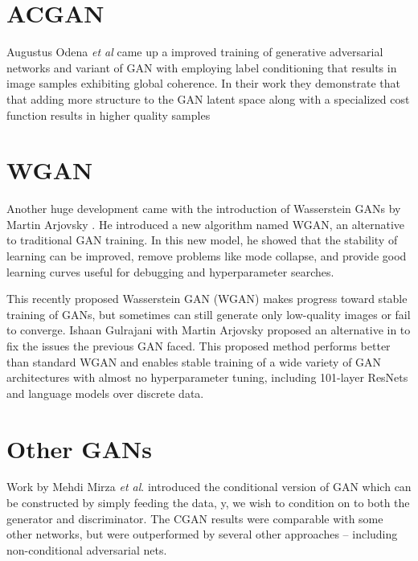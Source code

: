 
\section{ACGAN} %
\label{sec:acgan}
Augustus Odena \textit{et al} \cite{acgan} came up a improved training of generative adversarial networks and variant of GAN with employing label conditioning that results in image samples exhibiting global coherence. In their work they demonstrate that that adding more structure to the GAN latent space along with a specialized cost function results in higher quality samples

\section{WGAN} %
\label{sec:wgan}
Another huge development came with the introduction of Wasserstein GANs by Martin Arjovsky \cite{wgan} . He introduced a new algorithm named WGAN, an alternative to traditional GAN training. In this new model, he showed that the stability of learning can be improved, remove problems like mode collapse, and provide good learning curves useful for debugging and hyperparameter searches.
\par\bigskip

This recently proposed Wasserstein GAN (WGAN) \cite{wgan} makes progress toward stable training of GANs, but sometimes can still generate only low-quality images or fail to converge. 
Ishaan Gulrajani with Martin Arjovsky proposed an alternative in \cite{improvedwgan} to fix the issues the previous GAN faced. This proposed method performs better than standard WGAN and enables stable training of a wide variety of GAN architectures with almost no hyperparameter tuning, including 101-layer ResNets \cite{deepresidual} and language models over discrete data.
\par\bigskip

\section{Other GANs} %
\label{sec:other_gan}
Work by Mehdi Mirza \textit{et al}. \cite{congan} introduced the conditional version of GAN which can be constructed by simply feeding the data, y, we wish to condition on to both the generator and discriminator. The CGAN results were comparable with some other networks, but were outperformed by several other approaches – including non-conditional adversarial nets.
\par\bigskip

